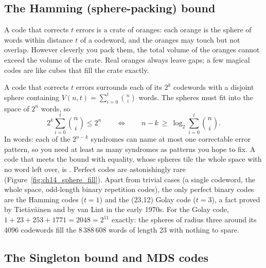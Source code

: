 \subsection{The Hamming (sphere-packing) bound}

\begin{analogy}
A code that corrects $t$ errors is a crate of oranges: each orange is the sphere of words within
distance $t$ of a codeword, and the oranges may touch but not overlap. However cleverly you pack
them, the total volume of the oranges cannot exceed the volume of the crate. Real oranges always
leave gaps; a few magical codes are like cubes that fill the crate exactly.
\end{analogy}

A code that corrects $t$ errors surrounds each of its $2^k$ codewords with a disjoint sphere
containing $V(n,t)=\sum_{i=0}^{t}\binom ni$ words. The spheres must fit into the space of $2^n$
words, so
\begin{equation}
2^k\sum_{i=0}^{t}\binom ni\le2^n
\qquad\Longleftrightarrow\qquad
n-k\ \ge\ \log_2\sum_{i=0}^{t}\binom ni .
\label{eq:ch14:hamming}
\end{equation}
In words: each of the $2^{n-k}$ syndromes can name at most one correctable error pattern, so you need
at least as many syndromes as patterns you hope to fix. A code that meets the bound with equality,
whose spheres tile the whole space with no word left over, is . Perfect codes are
astonishingly rare (Figure~\ref{fig:ch14_sphere_fill}). Apart from trivial cases (a single
codeword, the whole space, odd-length binary repetition codes), the only perfect binary codes are
the Hamming codes ($t=1$) and the (23,12) Golay code ($t=3$), a fact proved by Tietäväinen and by
van Lint in the early 1970s. For the Golay code, $1+23+253+1771=2048=2^{11}$ exactly: the
spheres of radius three around its 4096 codewords fill the 8\,388\,608 words of length 23 with
nothing to spare.


\subsection{The Singleton bound and MDS codes}


